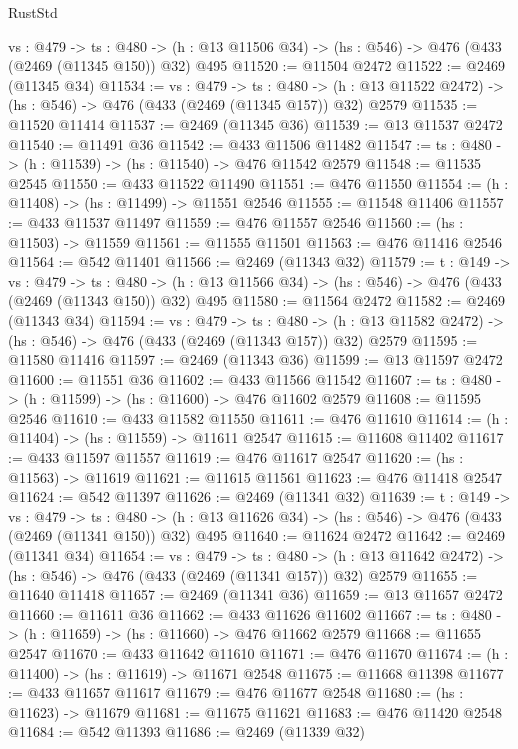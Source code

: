 \begin{lexlean}{RustStd}
\begin{coremodule}
  {vs : @479} ->
  {ts : @480} -> (h : @13 @11506 @34) -> (hs : @546) -> @476 (@433 (@2469 (@11345 @150)) @32) @495
@11520 := @11504 @2472
@11522 := @2469 (@11345 @34)
@11534 := {vs : @479} ->
  {ts : @480} ->
  (h : @13 @11522 @2472) -> (hs : @546) -> @476 (@433 (@2469 (@11345 @157)) @32) @2579
@11535 := @11520 @11414
@11537 := @2469 (@11345 @36)
@11539 := @13 @11537 @2472
@11540 := @11491 @36
@11542 := @433 @11506 @11482
@11547 := {ts : @480} -> (h : @11539) -> (hs : @11540) -> @476 @11542 @2579
@11548 := @11535 @2545
@11550 := @433 @11522 @11490
@11551 := @476 @11550
@11554 := (h : @11408) -> (hs : @11499) -> @11551 @2546
@11555 := @11548 @11406
@11557 := @433 @11537 @11497
@11559 := @476 @11557 @2546
@11560 := (hs : @11503) -> @11559
@11561 := @11555 @11501
@11563 := @476 @11416 @2546
@11564 := @542 @11401
@11566 := @2469 (@11343 @32)
@11579 := {t : @149} ->
  {vs : @479} ->
  {ts : @480} -> (h : @13 @11566 @34) -> (hs : @546) -> @476 (@433 (@2469 (@11343 @150)) @32) @495
@11580 := @11564 @2472
@11582 := @2469 (@11343 @34)
@11594 := {vs : @479} ->
  {ts : @480} ->
  (h : @13 @11582 @2472) -> (hs : @546) -> @476 (@433 (@2469 (@11343 @157)) @32) @2579
@11595 := @11580 @11416
@11597 := @2469 (@11343 @36)
@11599 := @13 @11597 @2472
@11600 := @11551 @36
@11602 := @433 @11566 @11542
@11607 := {ts : @480} -> (h : @11599) -> (hs : @11600) -> @476 @11602 @2579
@11608 := @11595 @2546
@11610 := @433 @11582 @11550
@11611 := @476 @11610
@11614 := (h : @11404) -> (hs : @11559) -> @11611 @2547
@11615 := @11608 @11402
@11617 := @433 @11597 @11557
@11619 := @476 @11617 @2547
@11620 := (hs : @11563) -> @11619
@11621 := @11615 @11561
@11623 := @476 @11418 @2547
@11624 := @542 @11397
@11626 := @2469 (@11341 @32)
@11639 := {t : @149} ->
  {vs : @479} ->
  {ts : @480} -> (h : @13 @11626 @34) -> (hs : @546) -> @476 (@433 (@2469 (@11341 @150)) @32) @495
@11640 := @11624 @2472
@11642 := @2469 (@11341 @34)
@11654 := {vs : @479} ->
  {ts : @480} ->
  (h : @13 @11642 @2472) -> (hs : @546) -> @476 (@433 (@2469 (@11341 @157)) @32) @2579
@11655 := @11640 @11418
@11657 := @2469 (@11341 @36)
@11659 := @13 @11657 @2472
@11660 := @11611 @36
@11662 := @433 @11626 @11602
@11667 := {ts : @480} -> (h : @11659) -> (hs : @11660) -> @476 @11662 @2579
@11668 := @11655 @2547
@11670 := @433 @11642 @11610
@11671 := @476 @11670
@11674 := (h : @11400) -> (hs : @11619) -> @11671 @2548
@11675 := @11668 @11398
@11677 := @433 @11657 @11617
@11679 := @476 @11677 @2548
@11680 := (hs : @11623) -> @11679
@11681 := @11675 @11621
@11683 := @476 @11420 @2548
@11684 := @542 @11393
@11686 := @2469 (@11339 @32)

\end{coremodule}
\end{lexlean}
